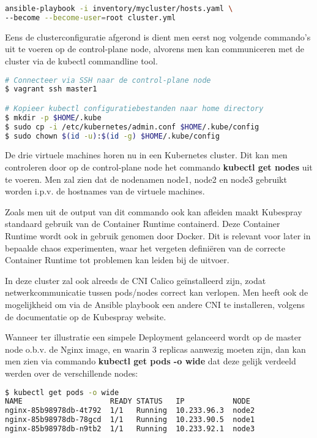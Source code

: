 \begin{lstlisting}[language=bash]
ansible-playbook -i inventory/mycluster/hosts.yaml \
--become --become-user=root cluster.yml

\end{lstlisting}

Eens de clusterconfiguratie afgerond is dient men eerst nog volgende commando's uit te voeren op de control-plane node, alvorens men kan communiceren met de cluster via de kubectl commandline tool. 
\begin{lstlisting}[language=bash] 
# Connecteer via SSH naar de control-plane node    
$ vagrant ssh master1

# Kopieer kubectl configuratiebestanden naar home directory
$ mkdir -p $HOME/.kube
$ sudo cp -i /etc/kubernetes/admin.conf $HOME/.kube/config
$ sudo chown $(id -u):$(id -g) $HOME/.kube/config

\end{lstlisting}

De drie virtuele machines horen nu in een Kubernetes cluster. Dit kan men controleren door op de control-plane node het commando {\bf kubectl get nodes} uit te voeren. 
Men zal zien dat de nodenamen node1, node2 en node3 gebruikt worden i.p.v. de hostnames van de virtuele machines.

Zoals men uit de output van dit commando ook kan afleiden maakt Kubespray standaard gebruik van de Container Runtime containerd. Deze Container Runtime wordt ook in gebruik genomen door Docker. Dit is relevant voor later in bepaalde chaos experimenten, waar het vergeten definiëren van de correcte Container Runtime tot problemen kan leiden bij de uitvoer. 

In deze cluster zal ook alreeds de CNI Calico geïnstalleerd zijn, zodat netwerkcommunicatie tussen pods/nodes correct kan verlopen. Men heeft ook de mogelijkheid om via de Ansible playbook een andere CNI te installeren, volgens de documentatie op de Kubespray website. 

Wanneer ter illustratie een simpele Deployment gelanceerd wordt op de master node o.b.v. de Nginx image, en waarin 3 replicas aanwezig moeten zijn, dan kan men zien via commando {\bf kubectl get pods -o wide} dat deze gelijk verdeeld werden over de verschillende nodes:

\begin{lstlisting}[language=bash]
$ kubectl get pods -o wide
NAME                    READY STATUS   IP           NODE
nginx-85b98978db-4t792  1/1   Running  10.233.96.3  node2
nginx-85b98978db-78gcd  1/1   Running  10.233.90.5  node1
nginx-85b98978db-n9tb2  1/1   Running  10.233.92.1  node3

\end{lstlisting}

